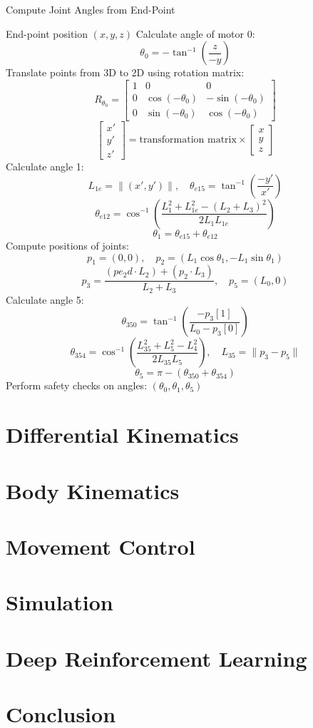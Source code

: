 \documentclass[a4paper,11pt]{article}
\begin{document}
\begin{algorithm}[H]
	\caption{Compute Joint Angles from End-Point}
	\begin{algorithmic}[1]
			\Require End-point position $(x, y, z)$
			\State Calculate angle of motor 0:
			\[
				\theta_0 = -\tan^{-1} \left( \frac{z}{-y} \right)
			\]
			\State Translate points from 3D to 2D using rotation matrix:
			\[
				R_{\theta_0} =
					\begin{bmatrix}
							1 & 0 & 0 \\
							0 & \cos(-\theta_0) & -\sin(-\theta_0) \\
							0 & \sin(-\theta_0) & \cos(-\theta_0)
					\end{bmatrix}
			\]
			\[
				\begin{bmatrix} x' \\ y' \\ z' \end{bmatrix} = \text{transformation matrix} \times \begin{bmatrix} x \\ y \\ z \end{bmatrix}
			\]
			\State Calculate angle 1:
			\[
					L_{1e} = \| (x', y') \|, \quad
					\theta_{e15} = \tan^{-1} \left( \frac{-y'}{x'} \right)
			\]
			\[
					\theta_{e12} = \cos^{-1} \left( \frac{L_1^2 + L_{1e}^2 - (L_2 + L_3)^2}{2 L_1 L_{1e}} \right)
			\]
			\[
					\theta_1 = \theta_{e15} + \theta_{e12}
			\]
			\State Compute positions of joints:
			\[
					p_1 = (0, 0), \quad
					p_2 = (L_1 \cos \theta_1, -L_1 \sin \theta_1)
			\]
			\[
					p_3 = \frac{(pe_2d \cdot L_2) + (p_2 \cdot L_3)}{L_2 + L_3}, \quad
					p_5 = (L_0, 0)
			\]
			\State Calculate angle 5:
			\[
				\theta_{350} = \tan^{-1} \left( \frac{-p_3[1]}{L_0 - p_3[0]} \right)
			\]
			\[
					\theta_{354} = \cos^{-1} \left( \frac{L_{35}^2 + L_5^2 - L_4^2}{2 L_{35} L_5} \right), \quad
					L_{35} = \| p_3 - p_5 \|
			\]
			\[
					\theta_5 = \pi - (\theta_{350} + \theta_{354})
			\]
			\State Perform safety checks on angles:
			\State \Return $(\theta_0, \theta_1, \theta_5)$
	\end{algorithmic}
\end{algorithm}

\section*{Differential Kinematics}

\section*{Body Kinematics}

\section*{Movement Control}

\section*{Simulation}

\section*{Deep Reinforcement Learning}

\section*{Conclusion}
\end{document}
